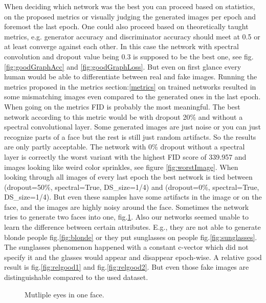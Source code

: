 \documentclass[12pt, a4paper]{article}
\begin{document}
When deciding which network was the best you can proceed based on statistics, on the proposed metrics or visually judging the generated images per epoch and foremost the last epoch.
One could also proceed based on theoretically taught metrics, e.g. generator accuracy and discriminator accuracy should meet at 0.5 or at least converge against each other. In this case the network with spectral convolution and dropout 
value being 0.3 is supposed to be the best one, see fig.\ref{fig:goodGraphAcc} and \ref{fig:goodGraphLoss}. But even on first glance every human would be able to differentiate between real and fake images.
Running the metrics proposed in the metrics section:\ref{metrics} on trained networks resulted in some mismatching images even compared to the generated ones in the last epoch. When going on the metrics FID is probably the most meaningful. The best network according to this metric would be with dropout 20\% and without a spectral convolutional layer. Some generated images are just noise or you can just recognize parts of a face but the rest is still just random artifacts. So the results are only partly acceptable. The network with 0\% dropout without a spectral layer is correctly the worst variant with the highest FID score of 339.957 and images looking like weird color sprinkles, see figure \ref{fig:worstImage}.
When looking through all images of every last epoch the best network is tied between (dropout=50\%, spectral=True, DS\_size=1/4) and (dropout=0\%, spectral=True, DS\_size=1/4). But even these samples have some artifacts in the image or on the face, and the images are highly noisy around the face.
Sometimes the network tries to generate two faces into one, fig.\ref{fig:twoFacesInOne}. 
Also our networks seemed unable to learn the difference between certain attributes. 
E.g., they are not able to generate blonde people fig.\ref{fig:blonde} or they put sunglasses on people fig.\ref{fig:sunglasses}. The sunglasses phenomenon happened with a constant c-vector which did not specify it and the glasses would appear and disappear epoch-wise.
A relative good result is fig.\ref{fig:relgood1} and fig.\ref{fig:relgood2}. But even those fake images are distinguishable compared to the used dataset.
\begin{figure}
    \caption{Mutliple eyes in one face.}
    \label{fig:twoFacesInOne}
\end{figure}
\end{document}

